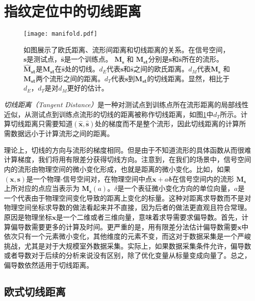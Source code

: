 \section{指纹定位中的切线距离}

\begin{figure}[tb]
	\centering
	\texttt{[image: manifold.pdf]}
	\caption{如图展示了欧氏距离、流形间距离和切线距离的关系。在信号空间，$\mathbf{s}$是测试点，$\widehat{\mathbf{s}}$是一个训练点。 $\boldsymbol{M_s}$ 和 $\boldsymbol{M_{st}}$分别是$\mathbf{s}$和$\widehat{\mathbf{s}}$所在的流形。$\boldsymbol{\widehat{M}_{st}}$是$\boldsymbol{M_{st}}$在$\widehat{\mathbf{s}}$处的切线。$d_E$代表$\mathbf{s}$和$\widehat{\mathbf{s}}$之间的欧氏距离。$d_M$代表$\boldsymbol{M_s}$ 和 $\boldsymbol{M_{st}}$两个流形之间的距离。$d_T$代表$\mathbf{s}$到$\boldsymbol{M_{st}}$的切线距离。显然，相比于$d_E$，$d_T$是对$d_M$更好的估计。}
	\label{fig:manifold}
\end{figure}

\textit{切线距离（Tangent Distance）}是一种对测试点到训练点所在流形距离的局部线性近似，从测试点到训练点流形的切线的距离被称作切线距离，如图\ref{fig:manifold}中$d_T$所示。计算切线距离只需要知道$(\widehat{\mathbf{x}}, \widehat{\mathbf{s}})$处的梯度而不是整个流形，因此切线距离的计算所需数据远小于计算流形之间的距离。

理论上，切线的方向与流形的梯度相同。但是由于不知道流形的具体函数从而很难计算梯度，我们将用有限差分获得切线方向。注意到，在我们的场景中，信号空间内的流形由物理空间的微小变化形成，也就是距离的微小变化。比如，如果$(\mathbf{x}, \mathbf{s})$是一个物理-信号空间对，在物理空间中点$\mathbf{x} + a{\bm{\delta}}$在信号空间内的流形 $\boldsymbol{M_s}$上所对应的点应当表示为 $\boldsymbol{M_s}(a)$。$\delta$是一个表征微小变化方向的单位向量，$a$是一个代表由于物理空间变化导致的距离上变化的标量。这种对距离求导数而不是对物理空间坐标求导数的做法看起来并不直接，因为后者的做法更直观且符合常理。原因是物理坐标$\mathbf{x}$是一个二维或者三维向量，意味着求导需要求偏导数。首先，计算偏导数需要更多的计算及时间。更严重的是，用有限差分法估计偏导数需要$\mathbf{x}$中依次只有一个元素微小变化，其他维度的元素不变，而这对于数据采集是一个严峻挑战，尤其是对于大规模室外数据采集。实际上，如果数据采集条件允许，偏导数或者导数对于后续的分析来说没有区别，除了优化变量从标量变成向量了。总之，偏导数依然适用于切线距离。

\subsection{欧式切线距离}

